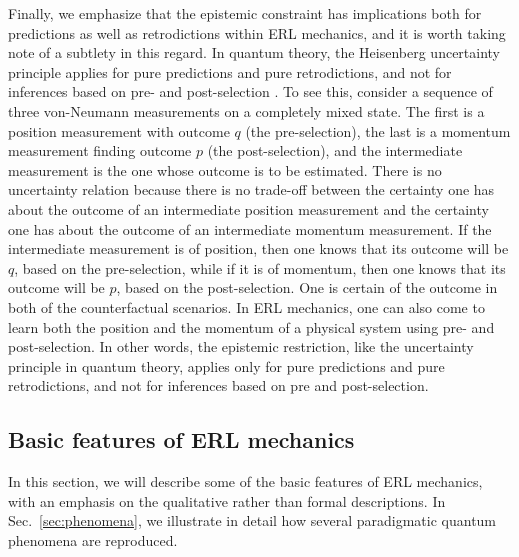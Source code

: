 \documentclass[pra,superscriptaddress,nofootinbib,12pt]{revtex4-2}
\begin{document}
Finally, we emphasize that the epistemic constraint has implications both for predictions as well as retrodictions within ERL mechanics, and it is worth taking note of a subtlety in this regard.  In quantum theory, the Heisenberg uncertainty principle applies for pure predictions and pure retrodictions, and not for inferences based on pre- and post-selection \cite{Aharonov2008}.  To see this, consider a sequence of three von-Neumann measurements on a completely mixed state.  The first is a position measurement with outcome $q$ (the pre-selection), the last is a momentum measurement finding outcome $p$ (the post-selection), and the intermediate measurement is the one whose outcome is to be estimated.  There is no uncertainty relation because there is no trade-off between the certainty one has about the outcome of an intermediate position measurement and the certainty one has about the outcome of an intermediate momentum measurement.  If the intermediate measurement is of position, then one knows that its outcome will be $q$, based on the pre-selection, while if it is of momentum, then one knows that its outcome will be $p$, based on the post-selection.  One is certain of the outcome in both of the counterfactual scenarios.  In ERL mechanics, one can also come to learn both the position and the momentum of a physical system using pre- and post-selection.  In other words, the epistemic restriction, like the uncertainty principle in quantum theory, applies only for pure predictions and pure retrodictions, and not for inferences based on pre and post-selection.


\subsection{Basic features of ERL mechanics}
\label{sec:BasicFeatures}

In this section, we will describe some of the basic features of ERL mechanics, with an emphasis on the qualitative rather than formal descriptions.  In Sec.~\ref{sec:phenomena}, we illustrate in detail how several paradigmatic quantum phenomena are reproduced.

\end{document}
